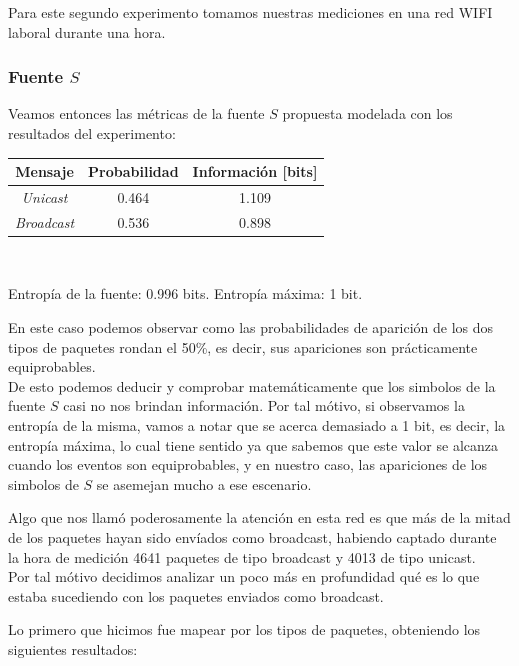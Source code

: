 \par Para este segundo experimento tomamos nuestras mediciones en una red WIFI laboral durante una hora.

\subsubsection{Fuente $S$}

\par Veamos entonces las m\'etricas de la fuente $S$ propuesta modelada con los resultados del experimento: \\

\begin{tabular}{ | c | c | c |}
    \hline
    Mensaje & Probabilidad & Información [bits] \\
    \hline
    \textit{Unicast} & 0.464 & 1.109 \\
    \hline
    \textit{Broadcast} & 0.536 & 0.898 \\
    \hline
\end{tabular} \\

\par Entropía de la fuente: 0.996 bits. Entropía máxima: 1 bit.

\par En este caso podemos observar como las probabilidades de aparici\'on de los dos tipos de paquetes rondan el 50\%, es decir, sus apariciones son pr\'acticamente equiprobables. \\
De esto podemos deducir y comprobar matem\'aticamente que los simbolos de la fuente $S$ casi no nos brindan informaci\'on. Por tal m\'otivo, si observamos la entrop\'ia de la misma, vamos a notar que se acerca demasiado a 1 bit, es decir, la entrop\'ia m\'axima, lo cual tiene sentido ya que sabemos que este valor se alcanza cuando los eventos son equiprobables, y en nuestro caso, las apariciones de los simbolos de $S$ se asemejan mucho a ese escenario.

\par Algo que nos llam\'o poderosamente la atenci\'on en esta red es que m\'as de la mitad de los paquetes hayan sido env\'iados como broadcast, habiendo captado durante la hora de medici\'on 4641 paquetes de tipo broadcast y 4013 de tipo unicast. \\
Por tal m\'otivo decidimos analizar un poco m\'as en profundidad qu\'e es lo que estaba sucediendo con los paquetes enviados como broadcast.

Lo primero que hicimos fue mapear por los tipos de paquetes, obteniendo los siguientes resultados:

